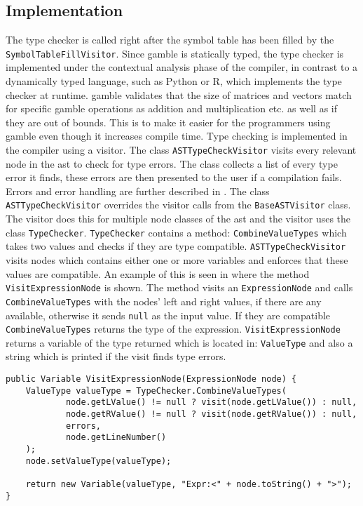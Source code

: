 \subsection*{Implementation}
The type checker is called right after the symbol table has been filled by the \texttt{SymbolTableFillVisitor}.
Since \gls{gamble} is statically typed, the type checker is implemented under the contextual analysis phase of the compiler, in contrast to a dynamically typed language, such as Python or R, which implements the type checker at runtime. 
\gls{gamble} validates that the size of matrices and vectors match for specific \gls{gamble} operations as addition and multiplication etc. as well as if they are out of bounds. 
This is to make it easier for the programmers using \gls{gamble} even though it increases compile time. 
Type checking is implemented in the compiler using a visitor. 
The class \texttt{ASTTypeCheckVisitor} visits every relevant node in the \acrshort{ast} to check for type errors.
The class collects a list of every type error it finds, these errors are then presented to the user if a compilation fails.
Errors and error handling are further described in .
The class \texttt{ASTTypeCheckVisitor} overrides the visitor calls from the \texttt{BaseASTVisitor} class.
The visitor does this for multiple node classes of the \acrshort{ast} and the visitor uses the class \texttt{TypeChecker}.
\texttt{TypeChecker} contains a method: \texttt{CombineValueTypes} which takes two values and checks if they are type compatible.
\texttt{ASTTypeCheckVisitor} visits nodes which contains either one or more variables and enforces that these values are compatible.
An example of this is seen in  where the method \texttt{VisitExpressionNode} is shown.
The method visits an \texttt{ExpressionNode} and calls \texttt{CombineValueTypes} with the nodes' left and right values, if there are any available, otherwise it sends \texttt{null} as the input value. 
If they are compatible \texttt{CombineValueTypes} returns the type of the expression.
\texttt{VisitExpressionNode} returns a variable of the type returned which is located in: \texttt{ValueType} and also a string which is printed if the visit finds type errors.

\begin{lstlisting}[caption=The VisitExprressionNode method in the ASTTypeChecker class,numbers=none,frame=tlrb,label={lst:typecheck1}]
public Variable VisitExpressionNode(ExpressionNode node) {
    ValueType valueType = TypeChecker.CombineValueTypes(
            node.getLValue() != null ? visit(node.getLValue()) : null,
            node.getRValue() != null ? visit(node.getRValue()) : null,
            errors,
            node.getLineNumber()
    );
    node.setValueType(valueType);

    return new Variable(valueType, "Expr:<" + node.toString() + ">");
}
\end{lstlisting}

